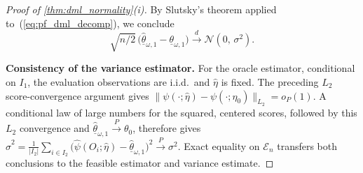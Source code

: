 \begin{proof}[Proof of \cref{thm:dml_normality}\textup{(i)}]
By Slutsky's theorem applied to~(\ref{eq:pf_dml_decomp}), we conclude
\[
    \sqrt{n/2}\,\bigl(\hat{\underline{\theta}}_{\omega,1} - \underline{\theta}_{\omega,1}\bigr) \xrightarrow{d} \mathcal{N}(0,\,\sigma^2).
\]

\medskip
\noindent\textbf{Consistency of the variance estimator.}
For the oracle estimator, conditional on $I_1$, the evaluation observations are i.i.d.\ and $\hat\eta$ is fixed. The preceding $L_2$ score-convergence argument gives $\|\psi(\cdot;\hat\eta)-\psi(\cdot;\eta_0)\|_{L_2}=o_P(1)$. A conditional law of large numbers for the squared, centered scores, followed by this $L_2$ convergence and $\hat{\underline\theta}_{\omega,1}\xrightarrow{P}\theta_0$, therefore gives $\hat{\sigma}^2 = \frac{1}{|I_2|}\sum_{i \in I_2}\bigl(\hat{\psi}(O_i;\hat{\eta}) - \hat{\underline{\theta}}_{\omega,1}\bigr)^2 \xrightarrow{P} \sigma^2$. Exact equality on $\mathcal E_n$ transfers both conclusions to the feasible estimator and variance estimate.
\end{proof}

